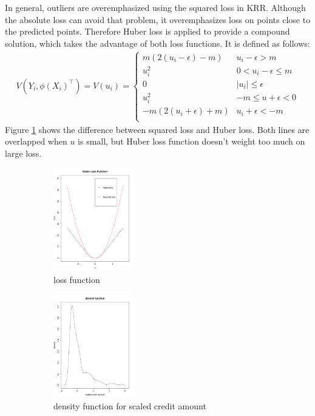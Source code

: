 \documentclass[11pt, oneside]{article}   	%
\newcommand{\reffig}[1]{Figure \ref{#1}\hspace{2pt}}
\begin{document}
In general, outliers are overemphasized using the squared loss in KRR. Although the absolute loss can avoid that problem, it overemphasizes loss on points close to the predicted points. Therefore Huber loss is applied to provide a compound solution, which takes the advantage of both loss functions.  It is defined as follows:
\begin{align}
V(Y_i, \phi(X_i)^{\top}) = V(u_i) =
\begin{cases}
m(2(u_i - \epsilon) - m) & u_i-\epsilon > m \\
u_i^2 & 0 < u_i - \epsilon \leq m\\
0 & |u_i| \leq \epsilon \\
u_i^2 & -m \leq u+\epsilon < 0\\
-m(2(u_i + \epsilon) + m) & u_i + \epsilon < -m \\
\end{cases}
\end{align}
\reffig{huber_loss} shows the difference between squared loss and Huber loss.  Both lines are overlapped when $u$ is small, but Huber loss function doesn't weight too much on large loss.
\begin{figure}[h]
\centering
        \begin{subfigure}[b]{0.475\textwidth}
            \centering
            \includegraphics[width=\textwidth, height=4.5cm]{huber_loss.pdf}
            \caption{loss function}\label{huber_loss}
        \end{subfigure}
        \quad
        \begin{subfigure}[b]{0.475\textwidth}
            \centering
            \includegraphics[width=\textwidth, height=4.5cm]{density_15}
            \caption{density function for scaled credit amount}\label{density_15}
        \end{subfigure}
        \caption{}
\end{figure}\\
\end{document}
